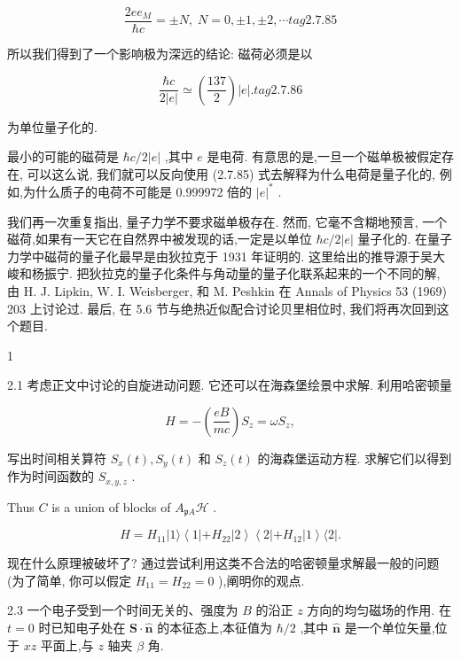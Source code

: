 \documentclass[lang=cn,newtx,10pt,scheme=chinese,thmcnt=section]{elegantbook}
\begin{document}
$$
\frac{{2e}{e}_{M}}{\hbar c} = \pm N,\;N = 0, \pm 1, \pm 2,\cdots tag{2. 7.85}
$$

所以我们得到了一个影响极为深远的结论: 磁荷必须是以

$$
\frac{\hbar c}{2\left| e\right| } \simeq \left( \frac{137}{2}\right) \left| e\right| . tag{2. 7.86}
$$

为单位量子化的.

最小的可能的磁荷是 $\hbar c/2\left| e\right|$ ,其中 $e$ 是电荷. 有意思的是,一旦一个磁单极被假定存在, 可以这么说, 我们就可以反向使用 (2.7.85) 式去解释为什么电荷是量子化的, 例如,为什么质子的电荷不可能是 0.999972 倍的 ${\left| e\right| }^{ * }$ .

我们再一次重复指出, 量子力学不要求磁单极存在. 然而, 它毫不含糊地预言, 一个磁荷,如果有一天它在自然界中被发现的话,一定是以单位 $\hbar c/2\left| e\right|$ 量子化的. 在量子力学中磁荷的量子化最早是由狄拉克于 1931 年证明的. 这里给出的推导源于吴大峻和杨振宁. 把狄拉克的量子化条件与角动量的量子化联系起来的一个不同的解, 由 H. J. Lipkin, W. I. Weisberger, 和 M. Peshkin 在 Annals of Physics 53 (1969) 203 上讨论过. 最后, 在 5.6 节与绝热近似配合讨论贝里相位时, 我们将再次回到这个题目.
\begin{problemset}
	\item 1
\end{problemset}

2.1 考虑正文中讨论的自旋进动问题. 它还可以在海森堡绘景中求解. 利用哈密顿量

$$
H = - \left( \frac{eB}{mc}\right) {S}_{z} = \omega {S}_{z},
$$

写出时间相关算符 ${S}_{x}\left( t\right) ,{S}_{y}\left( t\right)$ 和 ${S}_{z}\left( t\right)$ 的海森堡运动方程. 求解它们以得到作为时间函数的 ${S}_{x, y, z}$ .

Thus $C$ is a union of blocks of ${A}_{\mathfrak{p}A}\mathcal{H}$ .

$$
H = {H}_{11}\left| {1\rangle \left\langle {1\left| {+{H}_{22}}\right| 2}\right\rangle \left\langle {2\left| {+{H}_{12}}\right| 1}\right\rangle \langle 2}\right| .
$$

现在什么原理被破坏了? 通过尝试利用这类不合法的哈密顿量求解最一般的问题 (为了简单, 你可以假定 ${H}_{11} = {H}_{22} = 0$ ),阐明你的观点.

2.3 一个电子受到一个时间无关的、强度为 $B$ 的沿正 $z$ 方向的均匀磁场的作用. 在 $t = 0$ 时已知电子处在 $\mathbf{S} \cdot \widehat{\mathbf{n}}$ 的本征态上,本征值为 $\hbar /2$ ,其中 $\widehat{\mathbf{n}}$ 是一个单位矢量,位于 ${xz}$ 平面上,与 $z$ 轴夹 $\beta$ 角.
\end{document}
